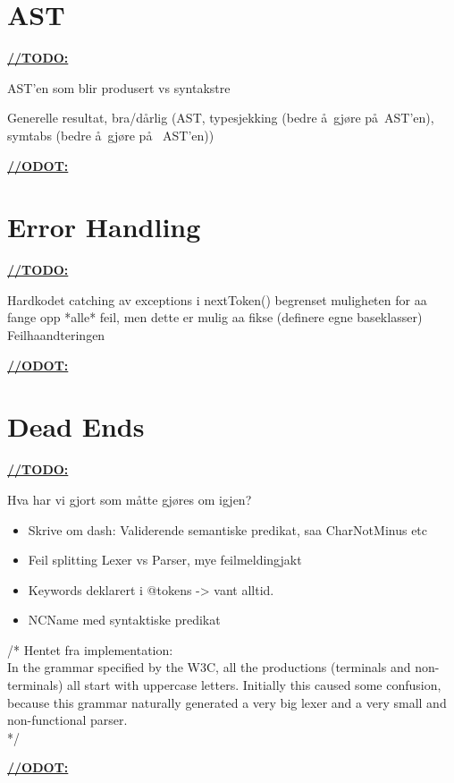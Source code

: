 \section{AST}
\underline{\textbf{\LARGE //TODO:}}

AST'en som blir produsert vs syntakstre

Generelle resultat, bra/d\aa rlig (AST, typesjekking (bedre \aa~gj\o re p\aa~AST'en),
symtabs (bedre \aa~gj\o re p\aa~ AST'en))

\underline{\textbf{\LARGE //ODOT:}}

\section{Error Handling}
\underline{\textbf{\LARGE //TODO:}}

Hardkodet catching av exceptions i nextToken() begrenset muligheten for aa
fange opp *alle* feil, men dette er mulig aa fikse (definere egne baseklasser)
Feilhaandteringen

\underline{\textbf{\LARGE //ODOT:}}

\section{Dead Ends}
\underline{\textbf{\LARGE //TODO:}}

Hva har vi gjort som m\aa tte gj\o res om igjen?

\begin{itemize}
\item Skrive om dash: Validerende semantiske predikat, saa CharNotMinus etc
\item Feil splitting Lexer vs Parser, mye feilmeldingjakt
\item Keywords deklarert i @tokens -> vant alltid.
\item NCName med syntaktiske predikat
\end{itemize}

/* Hentet fra implementation: \\
In the grammar specified by the W3C, all the productions (terminals and
non-terminals) all start with uppercase letters. Initially this caused some
confusion, because this grammar naturally generated a very big lexer and a very
small and non-functional parser. \\
*/

\underline{\textbf{\LARGE //ODOT:}}



